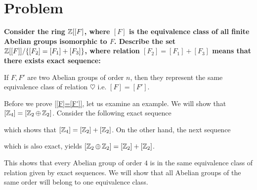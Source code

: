 \section{Problem}

{\bfseries%
  Consider the ring $\operatorname{\mathbb{Z}}[[F]$, where $[F]$ is the equivalence class of all finite Abelian groups isomorphic to $F$. Describe the set $\operatorname{\mathbb{Z}}[[F]]/\{[F_2]=[F_1]+[F_3]\}$, where relation $[F_2]=[F_1]+[F_3]$ means that there exists exact sequence:

  \begin{center}\end{center}
}

\begin{lemma}\label{[F]=[F']}
  If $F, F'$ are two Abelian groups of order $n$, then they represent the same equivalence class of relation $ \heartsuit $ i.e. $[F] = [F']$.
\end{lemma}

\begin{example}
  Before we prove \cref{[F]=[F']}, let us examine an example. We will show that $[\operatorname{\mathbb{Z}}_4]=[\operatorname{\mathbb{Z}}_2\oplus\operatorname{\mathbb{Z}}_2]$. Consider the following exact sequence
  \begin{center}\end{center}
  which shows that $[\operatorname{\mathbb{Z}}_4]=[\operatorname{\mathbb{Z}}_2]+[\operatorname{\mathbb{Z}}_2]$. On the other hand, the next sequence
  \begin{center}\end{center}
  which is also exact, yields $[\operatorname{\mathbb{Z}}_2\oplus\operatorname{\mathbb{Z}}_2]=[\operatorname{\mathbb{Z}}_2]+[\operatorname{\mathbb{Z}}_2]$.

  This shows that every Abelian group of order $4$ is in the same equivalence class of relation given by exact sequences. We will show that all Abelian groups of the same order will belong to one equivalence class.
\end{example}

